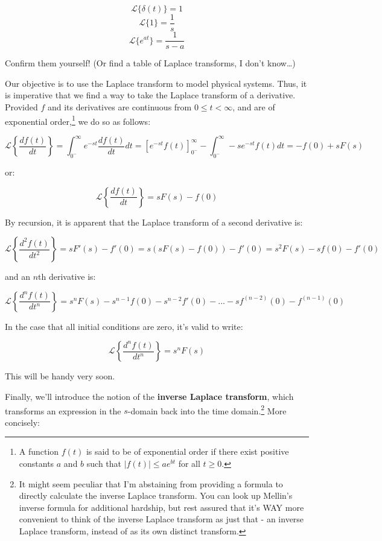 \documentclass[
  letterpaper,
  DIV=11,
  numbers=noendperiod]{scrreprt}
\begin{document}
\[\mathcal{L} \{ \delta(t) \} = 1\]
\[\mathcal{L} \{ 1 \} = \frac{1}{s}\]
\[\mathcal{L} \{ e^{at} \} = \frac{1}{s-a}\]

Confirm them yourself! (Or find a table of Laplace transforms, I don't
know\ldots)

Our objective is to use the Laplace transform to model physical systems.
Thus, it is imperative that we find a way to take the Laplace transform
of a derivative. Provided \(f\) and its derivatives are continuous from
\(0 \le t < \infty\), and are of exponential order,\footnote{A function
  \(f(t)\) is said to be of exponential order if there exist positive
  constants \(a\) and \(b\) such that \(|f(t)| \le ae^{bt}\) for all
  \(t\ge 0\).} we do so as follows:

\[\mathcal{L} \left \{\frac{df(t)}{dt} \right \} = \int_{0^-} ^\infty e^{-st} \frac{df(t)}{dt} dt = \left[ e^{-st} f(t) \right]_{0^-}^{\infty} - \int_{0^-} ^\infty -s e^{-st} f(t) dt = -f(0) + sF(s)\]

or:

\[\mathcal{L} \left \{ \frac{df(t)}{dt} \right \} = sF(s) - f(0)\]

By recursion, it is apparent that the Laplace transform of a second
derivative is:

\[\mathcal{L} \left \{\frac{d^2f(t)}{dt^2} \right \} = sF'(s) - f'(0)= s(sF(s) - f(0)) - f'(0) = s^2 F(s) - sf(0) - f'(0)\]

and an \(n\)th derivative is:

\[\mathcal{L} \left \{\frac{d^n f(t)}{dt^n} \right \} = s^n F(s) - s^{n-1} f(0) - s^{n-2} f'(0) - ...- s f^{(n-2)}(0) - f^{(n-1)} (0)\]

In the case that all initial conditions are zero, it's valid to write:

\[\mathcal{L} \left\{\frac{d^n f(t)}{dt^n}\right\} = s^n F(s)\]

This will be handy very soon.

Finally, we'll introduce the notion of the \textbf{inverse Laplace
transform}, which transforms an expression in the \(s\)-domain back into
the time domain.\footnote{It might seem peculiar that I'm abstaining
  from providing a formula to directly calculate the inverse Laplace
  transform. You can look up Mellin's inverse formula for additional
  hardship, but rest assured that it's WAY more convenient to think of
  the inverse Laplace transform as just that - an inverse Laplace
  transform, instead of as its own distinct transform.} More concisely:
\end{document}
